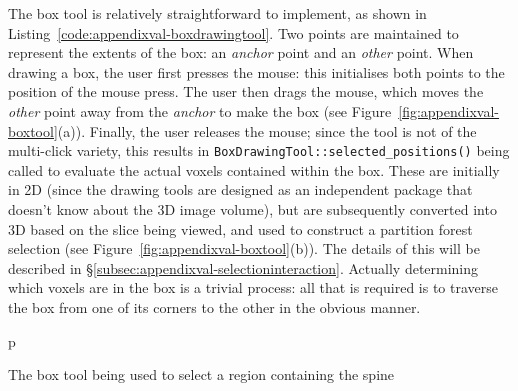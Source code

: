 The box tool is relatively straightforward to implement, as shown in Listing~\ref{code:appendixval-boxdrawingtool}. Two points are maintained to represent the extents of the box: an \emph{anchor} point and an \emph{other} point. When drawing a box, the user first presses the mouse: this initialises both points to the position of the mouse press. The user then drags the mouse, which moves the \emph{other} point away from the \emph{anchor} to make the box (see Figure~\ref{fig:appendixval-boxtool}(a)). Finally, the user releases the mouse; since the tool is not of the multi-click variety, this results in \texttt{BoxDrawingTool::selected_positions()} being called to evaluate the actual voxels contained within the box. These are initially in 2D (since the drawing tools are designed as an independent package that doesn't know about the 3D image volume), but are subsequently converted into 3D based on the slice being viewed, and used to construct a partition forest selection (see Figure~\ref{fig:appendixval-boxtool}(b)). The details of this will be described in \S\ref{subsec:appendixval-selectioninteraction}. Actually determining which voxels are in the box is a trivial process: all that is required is to traverse the box from one of its corners to the other in the obvious manner.

\begin{stusubfig}{p}
	\hspace{4mm}%
\caption{The box tool being used to select a region containing the spine}
\label{fig:appendixval-boxtool}
\end{stusubfig}

